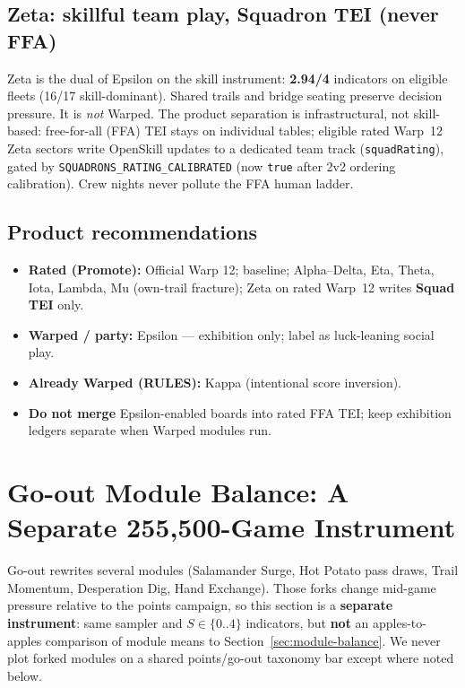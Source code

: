 \documentclass[11pt,letterpaper]{article}
\begin{document}
\subsection{Zeta: skillful team play, Squadron TEI (never FFA)}
Zeta is the dual of Epsilon on the skill instrument: \textbf{2.94/4} indicators on eligible fleets (16/17 skill-dominant). Shared trails and bridge seating preserve decision pressure. It is \emph{not} Warped. The product separation is infrastructural, not skill-based: free-for-all (FFA) TEI stays on individual tables; eligible rated Warp~12 Zeta sectors write OpenSkill updates to a dedicated team track (\texttt{squadRating}), gated by \texttt{SQUADRONS\_RATING\_CALIBRATED} (now \texttt{true} after 2v2 ordering calibration). Crew nights never pollute the FFA human ladder.

\subsection{Product recommendations}
\begin{itemize}
\item \textbf{Rated (Promote):} Official Warp 12; baseline; Alpha--Delta, Eta, Theta, Iota, Lambda, Mu (own-trail fracture); Zeta on rated Warp~12 writes \textbf{Squad TEI} only.
\item \textbf{Warped / party:} Epsilon --- exhibition only; label as luck-leaning social play.
\item \textbf{Already Warped (RULES):} Kappa (intentional score inversion).
\item \textbf{Do not merge} Epsilon-enabled boards into rated FFA TEI; keep exhibition ledgers separate when Warped modules run.
\end{itemize}

\section{Go-out Module Balance: A Separate 255{,}500-Game Instrument}
\label{sec:goout-module-balance}

Go-out rewrites several modules (Salamander Surge, Hot Potato pass draws, Trail Momentum, Desperation Dig, Hand Exchange). Those forks change mid-game pressure relative to the points campaign, so this section is a \textbf{separate instrument}: same sampler and $S\in\{0..4\}$ indicators, but \textbf{not} an apples-to-apples comparison of module means to Section~\ref{sec:module-balance}. We never plot forked modules on a shared points/go-out taxonomy bar except where noted below.
\end{document}
